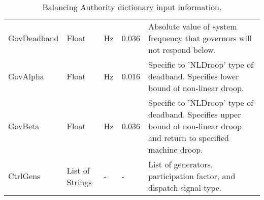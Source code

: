 \begin{landscape}
\begin{table}[!ht]
\begin{tabular}{@{} llllp{4in} @{}}
		GovDeadband	&	Float	&	Hz	&	0.036	&	Absolute value of system frequency that governors will not respond below.	\\
		GovAlpha	&	Float	&	Hz	&	0.016	&	Specific to 'NLDroop' type of deadband. Specifies lower bound of non-linear droop.	\\
		GovBeta	&	Float	&	Hz	&	0.036	&	Specific to 'NLDroop' type of deadband. Specifies upper  bound of non-linear droop and return to specified machine droop.	\\
		CtrlGens	&	List of Strings	&	-	&	-	&	List of generators, participation factor, and dispatch signal type.	\\
		\bottomrule
	\end{tabular}
	\caption{Balancing Authority dictionary input information.}
	\label{tab:BADict}
\end{table}
\end{landscape}
